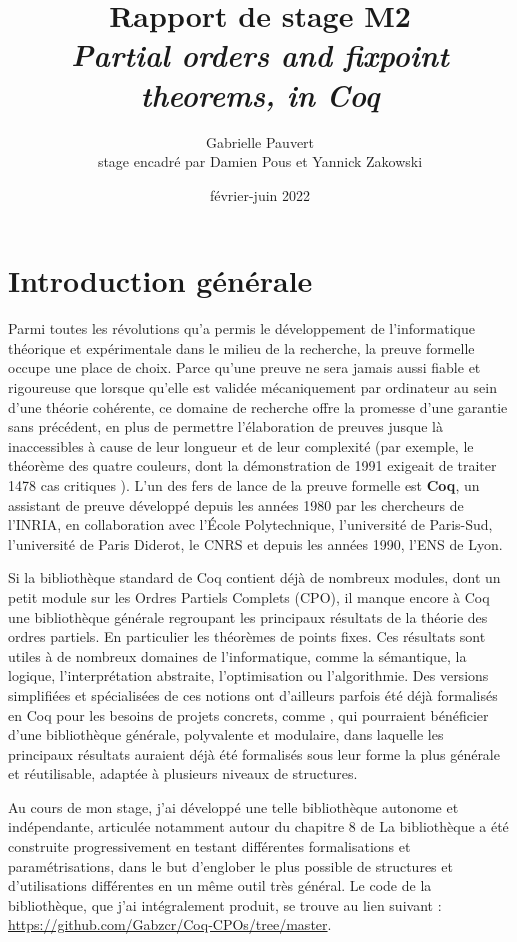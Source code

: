 \documentclass{article}
\title{Rapport de stage M2 \\ 
\textit{Partial orders and fixpoint theorems, in Coq}}
\date{février-juin 2022}
\author{Gabrielle Pauvert\\
stage encadré par Damien Pous et Yannick Zakowski}
\theoremstyle{definition}
\begin{document}
\maketitle

\section*{Introduction générale}

Parmi toutes les révolutions qu'a permis le développement de l'informatique théorique et expérimentale dans le milieu de la recherche, la preuve formelle occupe une place de choix. Parce qu'une preuve ne sera jamais aussi fiable et rigoureuse que lorsque qu'elle est validée mécaniquement par ordinateur au sein d'une théorie cohérente, ce domaine de recherche offre la promesse d'une garantie sans précédent, en plus de permettre l'élaboration de preuves jusque là inaccessibles à cause de leur longueur et de leur complexité (par exemple, le théorème des quatre couleurs, dont la démonstration de 1991 exigeait de traiter 1478 cas critiques \cite{4color}). L'un des fers de lance de la preuve formelle est \textbf{Coq}, un assistant de preuve développé depuis les années 1980 par les chercheurs de l'INRIA, en collaboration avec l'École Polytechnique, l'université de Paris-Sud, l'université de Paris Diderot, le CNRS et depuis les années 1990, l'ENS de Lyon.

Si la bibliothèque standard de Coq contient déjà de nombreux modules, dont un petit module sur les Ordres Partiels Complets (CPO), il manque encore à Coq une bibliothèque générale regroupant les principaux résultats de la théorie des ordres partiels. En particulier les théorèmes de points fixes. %
Ces résultats sont utiles à de nombreux domaines de l'informatique, comme la sémantique, la logique, l'interprétation abstraite, l'optimisation ou l'algorithmie. Des versions simplifiées et spécialisées de ces notions ont d'ailleurs parfois été déjà formalisés en Coq pour les besoins de projets concrets, comme %
, qui pourraient bénéficier d'une bibliothèque générale, polyvalente et modulaire, dans laquelle les principaux résultats auraient déjà été formalisés sous leur forme la plus générale et réutilisable, adaptée à plusieurs niveaux de structures.

Au cours de mon stage, j'ai développé une telle bibliothèque autonome et indépendante, articulée notamment autour du chapitre 8 de %
La bibliothèque a été construite progressivement en testant différentes formalisations et paramétrisations, dans le but d'englober le plus possible de structures et d'utilisations différentes en un même outil très général. Le code de la bibliothèque, que j'ai intégralement produit, se trouve au lien suivant : \href{https://github.com/Gabzcr/Coq-CPOs/tree/master}{https://github.com/Gabzcr/Coq-CPOs/tree/master}.
\end{document}
